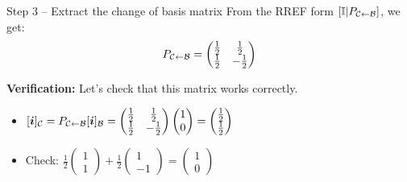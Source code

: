 \documentclass[aspectratio=169]{beamer}\usepackage[]{graphicx}\usepackage[]{xcolor}
\begin{document}
\begin{frame}{Step 3 -- Extract the change of basis matrix}
From the RREF form $[\mathbb{I}|P_{\mathcal{C}\leftarrow\mathcal{B}}]$, we get:
$$P_{\mathcal{C}\leftarrow\mathcal{B}} = \begin{pmatrix} \frac{1}{2} & \frac{1}{2} \\ \frac{1}{2} & -\frac{1}{2} \end{pmatrix}$$

\vfill
\textbf{Verification:} Let's check that this matrix works correctly.
\begin{itemize}
\item $[\bm{i}]_{\mathcal{C}} = P_{\mathcal{C}\leftarrow\mathcal{B}}[\bm{i}]_{\mathcal{B}} = \begin{pmatrix} \frac{1}{2} & \frac{1}{2} \\ \frac{1}{2} & -\frac{1}{2} \end{pmatrix}\begin{pmatrix} 1 \\ 0 \end{pmatrix} = \begin{pmatrix} \frac{1}{2} \\ \frac{1}{2} \end{pmatrix}$
\item Check: $\frac{1}{2}\begin{pmatrix} 1 \\ 1 \end{pmatrix} + \frac{1}{2}\begin{pmatrix} 1 \\ -1 \end{pmatrix} = \begin{pmatrix} 1 \\ 0 \end{pmatrix}$
\end{itemize}
\end{frame}
\end{document}
